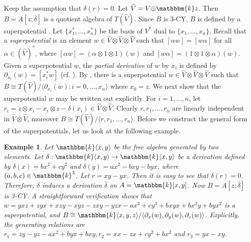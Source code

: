 \documentclass[a4paper]{amsart}
\newtheorem{exa}[thm]{Example}
\begin{document}
Keep the assumption that $\delta(r)=0$. Let $\widehat{V}=V{\oplus} {\mathbbm{k}} z$. Then $B=A[z;\bar{\delta}]$ is a quotient algebra of $T(\widehat{V})$. Since $B$ is 3-CY, $B$ is defined by a superpotential \cite[Theorem 3.1]{Bo}. Let $\{x_1^*,\dots,x_n^*\}$ be the basis of $V^*$ dual to $\{x_1,\dots,x_n\}$. Recall that a {\it superpotential} is an element $w\in \widehat{V}{\otimes} \widehat{V}{\otimes} \widehat{V}$ such that $[\alpha w]=[w\alpha]$ for all $\alpha\in(\widehat{V})^*$, where $[\alpha w]=(\alpha{\otimes} 1{\otimes} 1)(w)$ and $[w\alpha]=(1{\otimes} 1{\otimes} \alpha)(w)$. Given a superpotential $w$, the {\it partial derivative} of $w$ by $x_i$ is defined by $\partial_{x_i}(w)=[x^*_iw]$ (cf. \cite{BSW}). By \cite[Theorem 3.1]{Bo}, there is a superpotential $w\in \widehat{V}{\otimes} \widehat{V}{\otimes} \widehat{V}$ such that $B\cong T(\widehat{V})/\langle \partial_{x_i}(w):i=0,\dots,x_n\rangle$ where $x_0=z$. We next show that the superpotential $w$ may be written out explicitly. For $i=1,\dots,n$, let $r_i=z{\otimes} x_i-x_i{\otimes} z-\delta(x_i)\in\widehat{V}{\otimes} \widehat{V}$. Clearly $r,r_1,\dots,r_n$ are linearly independent in $\widehat{V}{\otimes} \widehat{V}$, moreover $B\cong T(\widehat{V})/\langle r,r_1,\dots,r_n\rangle$. Before we construct the general form of the superpotentials, let us look at the following example.

\begin{exa}\label{exa2} {\rm Let ${\mathbbm{k}} \langle x,y\rangle$ be the free algebra generated by two elements. Let $\delta:{\mathbbm{k}} \langle x,y\rangle\to {\mathbbm{k}} \langle x,y\rangle$ be a derivation defined by $\delta(x)=bx^2+cy^2$ and $\delta(y)=ax^2-bxy-byx$, where $(a,b,c)\in{\mathbbm{k}}^3$. Let $r=xy-yx$. Then it is easy to see that $\delta(r)=0$. Therefore, $\delta$ induces a derivation $\bar{\delta}$ on $A={\mathbbm{k}}[x,y]$. Now $B=A[z;\bar{\delta}]$ is 3-CY. A straightforward verification shows that $w=yxz+zyx+xzy-xyz-zxy-yzx-ax^3+cy^3+bxyx+bx^2y+byx^2$ is a superpotential, and $B\cong {\mathbbm{k}} \langle x,y,z \rangle/\langle\partial_x(w),\partial_{y}(w),\partial_{z}(w)\rangle$. Explicitly, the generating relations are $r_1=zy-yz-ax^2+byx+bxy, r_2=xx-zx+cy^2+bx^2$ and $r_3=yx-xy$.}
\end{exa}
\end{document}
